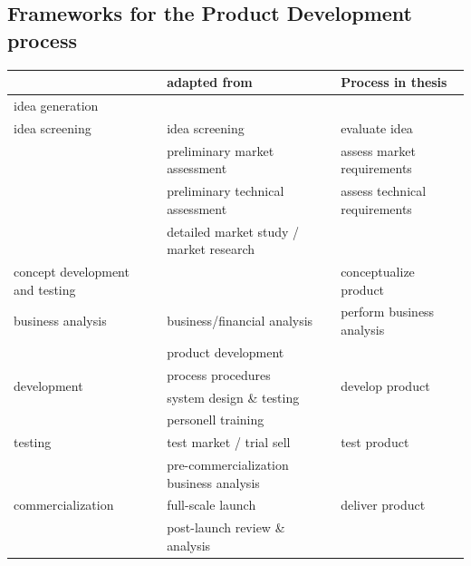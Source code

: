 \subsection{Frameworks for the Product Development process}
\label{app:pdframeworks}
\begin{table}[caption={Product Development Process Derivation}, label=tab:nsdframeworkds]
	\centering
\begin{tabular}{p{4cm}|p{5cm} |p{4.7cm}}
	\textbf{\cite{cowell1988new}} & \textbf{\cite{Edgett_1996}} adapted from \cite{cooper1988new}  & \textbf{Process in thesis}   \\ \hline \hline
	idea generation                 &                                         \\ \hline
	idea screening                  & idea screening   & evaluate idea                      \\ \hline
	& \textbullet \: preliminary market assessment     &assess market requirements    \\
	& \textbullet \: preliminary technical assessment  &assess technical requirements       \\
	& \textbullet \: detailed market study / market research \\ \hline
	concept development and testing &                       & conceptualize product                  \\ \hline
	business analysis               & business/financial analysis           & perform business analysis  \\ \hline
	\multirow{4}{*}{development}    & \textbullet \: product development      &	\multirow{4}{*}{develop product}               \\ 
	& \textbullet \: process procedures                      \\
	& \textbullet \: system design \& testing                \\
	& \textbullet \: personell training                      \\\hline
	testing                         & test market / trial sell       & test product         \\ \hline
	                      & pre-commercialization \:\:\:\:\:\:\:\:\:\:\:\:\:\:\:\:\:\:\: business analysis \\ \hline
	commercialization               & full-scale launch                   & deliver product    \\ \hline
	& post-launch review \& analysis         
\end{tabular}\\
\end{table}

